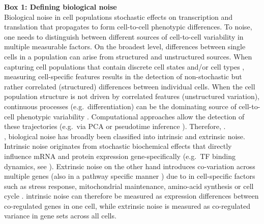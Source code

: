 \begin{Comment}
\hspace{-2.5mm}\textbf{Box 1: Defining biological noise}\label{box1}\\
\small
Biological noise in cell populations  stochastic effects on transcription and translation that propagates to form cell-to-cell phenotypic differences. 
To  noise, one needs to distinguish between different sources of cell-to-cell variability in multiple measurable factors. 
On the broadest level, differences between single cells in a population can arise from structured and unstructured sources. 
When capturing cell populations that contain discrete cell states and/or cell types \citep{Paul2015, Ibarra-Soria2018, Rosenberg2018}, measuring cell-specific features results in the detection of non-stochastic but rather correlated (structured) differences between individual cells. 
When the cell population structure is not driven by correlated features (unstructured variation), continuous processes (e.g.~differentiation) can be the dominating source of cell-to-cell phenotypic variability \citep{Dahlin2018}. 
Computational approaches allow the detection of these trajectories (e.g.~via \gls{PCA} or pseudotime inference \citep{Trapnell2014, Angerer2015}). 
Therefore, . \\

 \citep{Elowitz2002}, biological noise has broadly been classified into intrinsic and extrinsic noise. 
Intrinsic noise originates from stochastic biochemical effects that directly influence mRNA and protein expression gene-specifically (e.g.~\gls{TF} binding dynamics, see \citep{Swain2002}). 
Extrinsic noise on the other hand introduces co-variation across multiple genes (also in a pathway specific manner \citep{Raser2005}) due to  in cell-specific factors such as stress response, mitochondrial maintenance, amino-acid synthesis \citep{Stewart-Ornstein2012} or cell cycle \citep{Zopf2013}. 
 intrinsic noise can therefore be measured as expression differences between co-regulated genes in one cell, while extrinsic noise is measured as co-regulated variance in gene sets across all cells.
\end{Comment}

